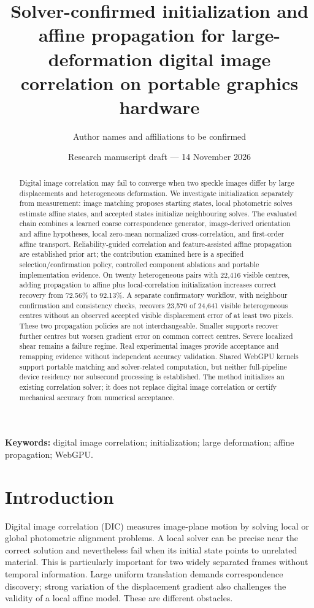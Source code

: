 \documentclass[11pt,a4paper]{article}
\title{Solver-confirmed initialization and affine propagation for large-deformation digital image correlation on portable graphics hardware}
\author{Author names and affiliations to be confirmed}
\date{Research manuscript draft --- 14 November 2026}
\begin{document}
\maketitle
\begin{abstract}
Digital image correlation may fail to converge when two speckle images differ by large displacements and heterogeneous deformation. We investigate initialization separately from measurement: image matching proposes starting states, local photometric solves estimate affine states, and accepted states initialize neighbouring solves. The evaluated chain combines a learned coarse correspondence generator, image-derived orientation and affine hypotheses, local zero-mean normalized cross-correlation, and first-order affine transport. Reliability-guided correlation and feature-assisted affine propagation are established prior art; the contribution examined here is a specified selection/confirmation policy, controlled component ablations and portable implementation evidence. On twenty heterogeneous pairs with 22,416 visible centres, adding propagation to affine plus local-correlation initialization increases correct recovery from 72.56\% to 92.13\%. A separate confirmatory workflow, with neighbour confirmation and consistency checks, recovers 23,570 of 24,641 visible heterogeneous centres without an observed accepted visible displacement error of at least two pixels. These two propagation policies are not interchangeable. Smaller supports recover further centres but worsen gradient error on common correct centres. Severe localized shear remains a failure regime. Real experimental images provide acceptance and remapping evidence without independent accuracy validation. Shared WebGPU kernels support portable matching and solver-related computation, but neither full-pipeline device residency nor subsecond processing is established. The method initializes an existing correlation solver; it does not replace digital image correlation or certify mechanical accuracy from numerical acceptance.
\end{abstract}
\noindent\textbf{Keywords:} digital image correlation; initialization; large deformation; affine propagation; WebGPU.

\section{Introduction}
Digital image correlation (DIC) measures image-plane motion by solving local or global photometric alignment problems. A local solver can be precise near the correct solution and nevertheless fail when its initial state points to unrelated material. This is particularly important for two widely separated frames without temporal information. Large uniform translation demands correspondence discovery; strong variation of the displacement gradient also challenges the validity of a local affine model. These are different obstacles.
\end{document}
